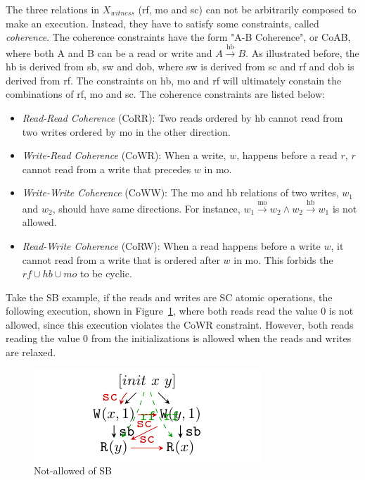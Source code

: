 The three relations in $X_{witness}$ (rf, mo and sc) can not be arbitrarily composed to make an execution. Instead, they have to satisfy some constraints, called \textit{coherence}. The coherence constraints have the form "A-B Coherence", or CoAB, where both A and B can be a read or write and  $A \xrightarrow{\text{hb}} B$. As illustrated before, the hb is derived from sb, sw and dob, where sw is derived from sc and rf and dob is derived from rf. The constraints on hb, mo and rf will ultimately constain the combinations of rf, mo and sc. The coherence constraints are listed below:

\begin{itemize}
	\item \textit{Read-Read Coherence} (CoRR): Two reads ordered by hb cannot read from two writes ordered by mo in the other direction.
	\item \textit{Write-Read Coherence} (CoWR): When a write, $w$, happens before a read $r$, $r$ cannot read from a write that precedes $w$ in mo.
	\item \textit{Write-Write Coherence} (CoWW): The mo and hb relations of two writes, $w_1$ and $w_2$, should have same directions. For instance, $w_1 \xrightarrow{\text{mo}} w_2 \land w_2 \xrightarrow{\text{hb}} w_1$ is not allowed.
	\item \textit{Read-Write Coherence} (CoRW): When a read happens before a write $w$, it cannot read from a write that is ordered after $w$ in mo. This forbids the $rf \cup hb \cup mo$ to be cyclic.
\end{itemize}


Take the SB example, if the reads and writes are SC atomic operations, the following execution, shown in Figure~\ref{NotAllowedSB}, where both reads read the value 0 is not allowed, since this execution violates the CoWR constraint. However, both reads reading the value 0 from the initializations is allowed when the reads and writes are relaxed.

\begin{figure}[htbp] %
	\centering
	\includegraphics[scale=1]{figure/exec-graph/SB3.pdf} %
	\caption{Not-allowed of SB} %
	\label{NotAllowedSB} %
\end{figure}
% 

